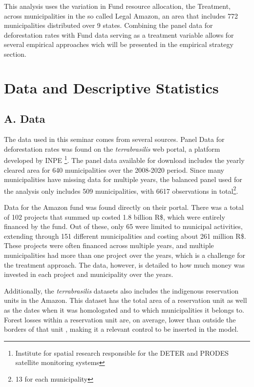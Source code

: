\documentclass[11pt, oneside]{article}   	%
\begin{document}
This analysis uses the variation in Fund resource allocation, the Treatment, across municipalities in the so called Legal Amazon, an area that includes 772 municipalities distributed over 9 states. Combining the panel data for deforestation rates with Fund data serving as a treatment variable allows for several empirical approaches wich will be presented in the empirical strategy section. 



\section{Data and Descriptive Statistics}
\subsection{A. Data}

The data used in this seminar comes from several sources. Panel Data for deforestation rates was found on the \textit{terrabrasilis} web portal, a platform developed by INPE \footnote{Institute for spatial research responsible for the DETER and PRODES satellite monitoring systems}. The panel data available for download includes the yearly cleared area for 640 municipalities over the 2008-2020 period. Since many municipalities have missing data for multiple years, the balanced panel used for the analysis only includes 509 municipalities, with 6617 observations in total\footnote{13 for each municipality}. 

Data for the Amazon fund was found directly on their portal. There was a total of 102 projects that summed up costed 1.8 billion R\$, which were entirely financed by the fund. Out of these, only 65 were limited to municipal activities, extending through 151 different municipalities and costing about 261 million R\$. These projects were often financed across multiple years, and multiple municipalities had more than one project over the years, which is a challenge for the treatment approach. The data, however, is detailed to how much money was invested in each project and municipality over the years. 

Additionally, the \textit{terrabrasilis} datasets also includes the indigenous reservation units in the Amazon. This dataset has the total area of a reservation unit as well as the dates when it was homologated and to which municipalities it belongs to. Forest losses within a reservation unit are, on average, lower than outside the borders of that unit \cite{baragwanath2020collective}, making it a relevant control to be inserted in the model. 
\end{document}
